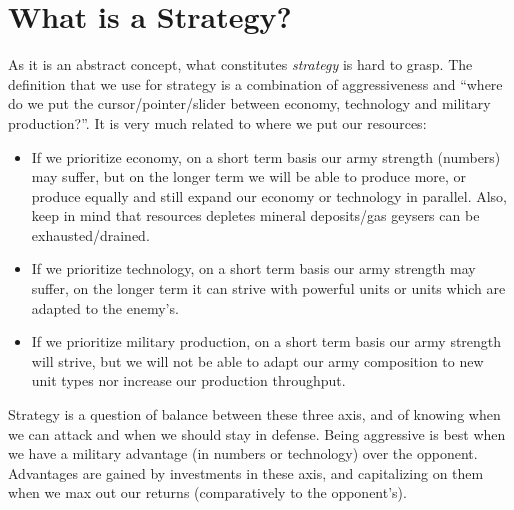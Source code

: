 \section{What is a Strategy?}


As it is an abstract concept, what constitutes \textit{strategy} is hard to grasp. The definition that we use for strategy is a combination of aggressiveness and ``where do we put the cursor/pointer/slider between economy, technology and military production?''. It is very much related to where we put our resources:
\begin{itemize}
    \item If we prioritize economy, on a short term basis our army strength (numbers) may suffer, but on the longer term we will be able to produce more, or produce equally and still expand our economy or technology in parallel. Also, keep in mind that resources depletes mineral deposits/gas geysers can be exhausted/drained.
    \item If we prioritize technology, on a short term basis our army strength may suffer, on the longer term it can strive with powerful units or units which are adapted to the enemy's.
    \item If we prioritize military production, on a short term basis our army strength will strive, but we will not be able to adapt our army composition to new unit types nor increase our production throughput.
\end{itemize}
Strategy is a question of balance between these three axis, and of knowing when we can attack and when we should stay in defense. Being aggressive is best when we have a military advantage (in numbers or technology) over the opponent. Advantages are gained by investments in these axis, and capitalizing on them when we max out our returns (comparatively to the opponent's).

